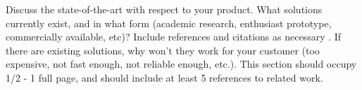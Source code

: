 Discuss the state-of-the-art with respect to your product. What solutions currently exist, and in what form (academic research, enthusiast prototype, commercially available, etc)? Include references and citations as necessary \cite{Rubin2012}. If there are existing solutions, why won't they work for your customer (too expensive, not fast enough, not reliable enough, etc.). This section should occupy 1/2 - 1 full page, and should include at least 5 references to related work.